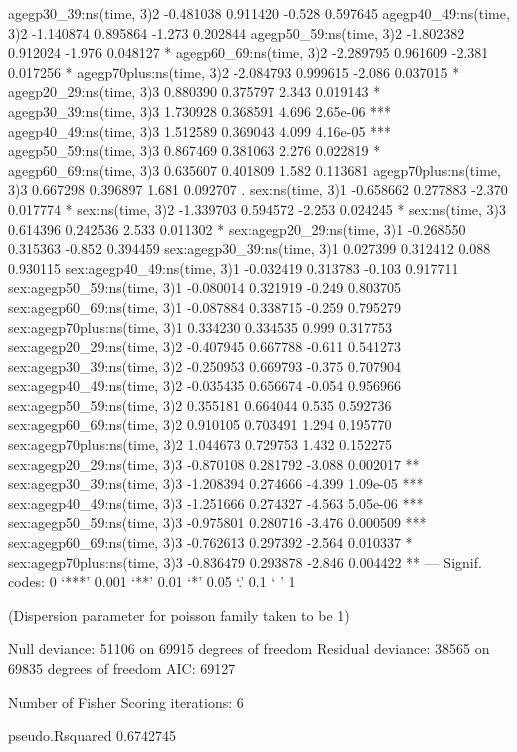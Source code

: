 \documentclass[a4paper]{article}                %
\begin{document}
\begin{Schunk}
\begin{Soutput}
agegp30_39:ns(time, 3)2             -0.481038   0.911420  -0.528 0.597645    
agegp40_49:ns(time, 3)2             -1.140874   0.895864  -1.273 0.202844    
agegp50_59:ns(time, 3)2             -1.802382   0.912024  -1.976 0.048127 *  
agegp60_69:ns(time, 3)2             -2.289795   0.961609  -2.381 0.017256 *  
agegp70plus:ns(time, 3)2            -2.084793   0.999615  -2.086 0.037015 *  
agegp20_29:ns(time, 3)3              0.880390   0.375797   2.343 0.019143 *  
agegp30_39:ns(time, 3)3              1.730928   0.368591   4.696 2.65e-06 ***
agegp40_49:ns(time, 3)3              1.512589   0.369043   4.099 4.16e-05 ***
agegp50_59:ns(time, 3)3              0.867469   0.381063   2.276 0.022819 *  
agegp60_69:ns(time, 3)3              0.635607   0.401809   1.582 0.113681    
agegp70plus:ns(time, 3)3             0.667298   0.396897   1.681 0.092707 .  
sex:ns(time, 3)1                    -0.658662   0.277883  -2.370 0.017774 *  
sex:ns(time, 3)2                    -1.339703   0.594572  -2.253 0.024245 *  
sex:ns(time, 3)3                     0.614396   0.242536   2.533 0.011302 *  
sex:agegp20_29:ns(time, 3)1         -0.268550   0.315363  -0.852 0.394459    
sex:agegp30_39:ns(time, 3)1          0.027399   0.312412   0.088 0.930115    
sex:agegp40_49:ns(time, 3)1         -0.032419   0.313783  -0.103 0.917711    
sex:agegp50_59:ns(time, 3)1         -0.080014   0.321919  -0.249 0.803705    
sex:agegp60_69:ns(time, 3)1         -0.087884   0.338715  -0.259 0.795279    
sex:agegp70plus:ns(time, 3)1         0.334230   0.334535   0.999 0.317753    
sex:agegp20_29:ns(time, 3)2         -0.407945   0.667788  -0.611 0.541273    
sex:agegp30_39:ns(time, 3)2         -0.250953   0.669793  -0.375 0.707904    
sex:agegp40_49:ns(time, 3)2         -0.035435   0.656674  -0.054 0.956966    
sex:agegp50_59:ns(time, 3)2          0.355181   0.664044   0.535 0.592736    
sex:agegp60_69:ns(time, 3)2          0.910105   0.703491   1.294 0.195770    
sex:agegp70plus:ns(time, 3)2         1.044673   0.729753   1.432 0.152275    
sex:agegp20_29:ns(time, 3)3         -0.870108   0.281792  -3.088 0.002017 ** 
sex:agegp30_39:ns(time, 3)3         -1.208394   0.274666  -4.399 1.09e-05 ***
sex:agegp40_49:ns(time, 3)3         -1.251666   0.274327  -4.563 5.05e-06 ***
sex:agegp50_59:ns(time, 3)3         -0.975801   0.280716  -3.476 0.000509 ***
sex:agegp60_69:ns(time, 3)3         -0.762613   0.297392  -2.564 0.010337 *  
sex:agegp70plus:ns(time, 3)3        -0.836479   0.293878  -2.846 0.004422 ** 
---
Signif. codes:  0 ‘***’ 0.001 ‘**’ 0.01 ‘*’ 0.05 ‘.’ 0.1 ‘ ’ 1

(Dispersion parameter for poisson family taken to be 1)

    Null deviance: 51106  on 69915  degrees of freedom
Residual deviance: 38565  on 69835  degrees of freedom
AIC: 69127

Number of Fisher Scoring iterations: 6
\end{Soutput}
\begin{Soutput}
pseudo.Rsquared 
      0.6742745 
\end{Soutput}
\end{Schunk}
\end{document}
